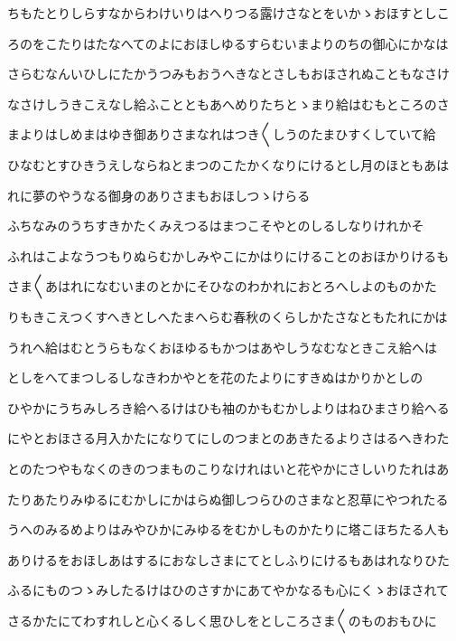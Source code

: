 \documentclass[a4paper,11pt,landscape]{ltjtarticle}
\begin{document}
\par\medskip
ちもたとりしらすなからわけいりはへりつる露けさなとをいかゝおほすとしこ
\par\medskip
ろのをこたりはたなへてのよにおほしゆるすらむいまよりのちの御心にかなは
\par\medskip
さらむなんいひしにたかうつみもおうへきなとさしもおほされぬこともなさけ
\par\medskip
なさけしうきこえなし給ふことともあへめりたちとゝまり給はむもところのさ
\par\medskip
まよりはしめまはゆき御ありさまなれはつき〱しうのたまひすくしていて給
\par\medskip
ひなむとすひきうえしならねとまつのこたかくなりにけるとし月のほともあは
\par\medskip
れに夢のやうなる御身のありさまもおほしつゝけらる
\par\medskip
ふちなみのうちすきかたくみえつるはまつこそやとのしるしなりけれかそ
\par\medskip
ふれはこよなうつもりぬらむかしみやこにかはりにけることのおほかりけるも
\par\medskip
さま〱あはれになむいまのとかにそひなのわかれにおとろへしよのものかた
\par\medskip
りもきこえつくすへきとしへたまへらむ春秋のくらしかたさなともたれにかは
\par\medskip
うれへ給はむとうらもなくおほゆるもかつはあやしうなむなときこえ給へは
\par\medskip
としをへてまつしるしなきわかやとを花のたよりにすきぬはかりかとしの
\par\medskip
ひやかにうちみしろき給へるけはひも袖のかもむかしよりはねひまさり給へる
\par\medskip
にやとおほさる月入かたになりてにしのつまとのあきたるよりさはるへきわた
\par\medskip
とのたつやもなくのきのつまものこりなけれはいと花やかにさしいりたれはあ
\par\medskip
たりあたりみゆるにむかしにかはらぬ御しつらひのさまなと忍草にやつれたる
\par\medskip
うへのみるめよりはみやひかにみゆるをむかしものかたりに塔こほちたる人も
\par\medskip
ありけるをおほしあはするにおなしさまにてとしふりにけるもあはれなりひた
\par\medskip
ふるにものつゝみしたるけはひのさすかにあてやかなるも心にくゝおほされて
\par\medskip
さるかたにてわすれしと心くるしく思ひしをとしころさま〱のものおもひに
\par\medskip
\end{document}
